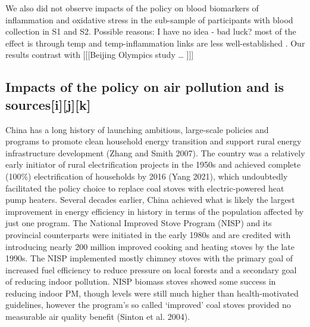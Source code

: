 \documentclass[
  letterpaper,
  DIV=11,
  numbers=noendperiod]{scrartcl}
\begin{document}
We also did not observe impacts of the policy on blood biomarkers of
inflammation and oxidative stress in the sub-sample of participants with
blood collection in S1 and S2. Possible reasons: I have no idea - bad
luck? most of the effect is through temp and temp-inflammation links are
less well-established . Our results contrast with {[}{[}{[}Beijing
Olympics study \ldots{} {]}{]}{]}

\hypertarget{impacts-of-the-policy-on-air-pollution-and-is-sourcesijk}{%
\subsection{Impacts of the policy on air pollution and is
sources{[}i{]}{[}j{]}{[}k{]}}\label{impacts-of-the-policy-on-air-pollution-and-is-sourcesijk}}

China has a long history of launching ambitious, large-scale policies
and programs to promote clean household energy transition and support
rural energy infrastructure development (Zhang and Smith 2007). The
country was a relatively early initiator of rural electrification
projects in the 1950s and achieved complete (100\%) electrification of
households by 2016 (Yang 2021), which undoubtedly facilitated the policy
choice to replace coal stoves with electric-powered heat pump heaters.
Several decades earlier, China achieved what is likely the largest
improvement in energy efficiency in history in terms of the population
affected by just one program. The National Improved Stove Program (NISP)
and its provincial counterparts were initiated in the early 1980s and
are credited with introducing nearly 200 million improved cooking and
heating stoves by the late 1990s. The NISP implemented mostly chimney
stoves with the primary goal of increased fuel efficiency to reduce
pressure on local forests and a secondary goal of reducing indoor
pollution. NISP biomass stoves showed some success in reducing indoor
PM, though levels were still much higher than health-motivated
guidelines, however the program's so called `improved' coal stoves
provided no measurable air quality benefit (Sinton et al. 2004).
\end{document}
